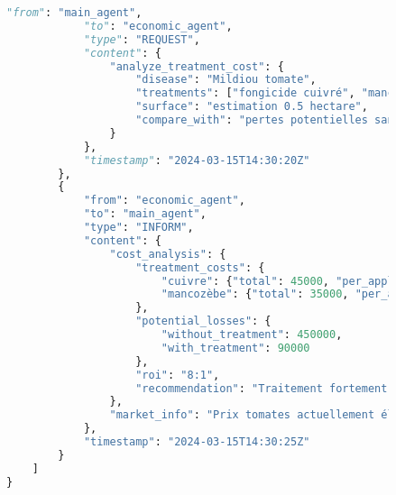 \begin{figure}[h]
\begin{lstlisting}[language=Python, caption=Exemples de communications inter-agents en action]
            "from": "main_agent",
            "to": "economic_agent",
            "type": "REQUEST",
            "content": {
                "analyze_treatment_cost": {
                    "disease": "Mildiou tomate",
                    "treatments": ["fongicide cuivré", "mancozèbe"],
                    "surface": "estimation 0.5 hectare",
                    "compare_with": "pertes potentielles sans traitement"
                }
            },
            "timestamp": "2024-03-15T14:30:20Z"
        },
        {
            "from": "economic_agent",
            "to": "main_agent",
            "type": "INFORM",
            "content": {
                "cost_analysis": {
                    "treatment_costs": {
                        "cuivre": {"total": 45000, "per_application": 15000},
                        "mancozèbe": {"total": 35000, "per_application": 11500}
                    },
                    "potential_losses": {
                        "without_treatment": 450000,
                        "with_treatment": 90000
                    },
                    "roi": "8:1",
                    "recommendation": "Traitement fortement rentable"
                },
                "market_info": "Prix tomates actuellement élevé (800 FCFA/kg)"
            },
            "timestamp": "2024-03-15T14:30:25Z"
        }
    ]
}


\end{lstlisting}
\end{figure}
